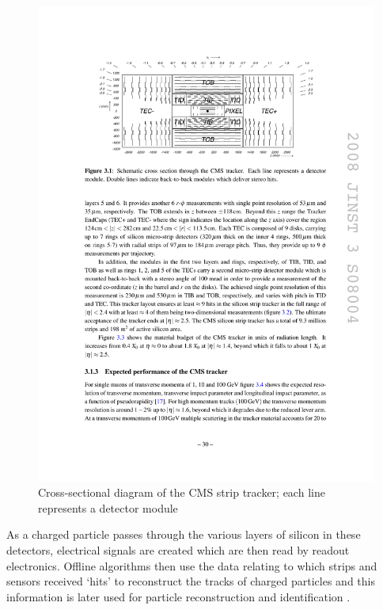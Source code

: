 \begin{figure}[hbtp]
   \centering
     \includegraphics[width=\textwidth]{Chapters/02_Detector/Images/tracker.pdf}\hfill
     \caption[Cross-sectional diagram of the CMS strip tracker.]{Cross-sectional diagram of the CMS strip
     tracker; each line represents a detector module
     \cite{CMS_TDR1}}
     \label{fig:CMS_strip_tracker}
\end{figure}

As a charged particle passes through the various layers of silicon in these detectors, electrical signals are
created which are then read by readout electronics. Offline algorithms then use the data relating to which
strips and sensors received `hits' to reconstruct the tracks of charged particles and this information is
later used for particle reconstruction and identification \cite{CMS_experiment,CMS_Tracking_Early_Results}.

